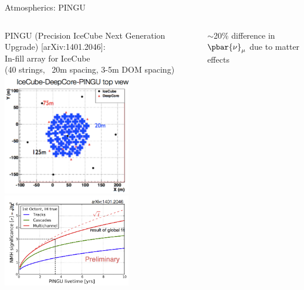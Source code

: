 \begin{frame}{Atmospherics: PINGU}
\begin{columns}
  \begin{column}{0.50\textwidth}
   \centering
   {\scriptsize
    PINGU (Precision IceCube Next Generation Upgrade) {\color{blue}[arXiv:1401.2046]}:\\
    In-fill array for IceCube\\
    (40 strings, ~20m spacing, 3-5m DOM spacing)\\
   }
   \includegraphics[width=0.65\textwidth]{./images/3nu/atmo/pingu_topview.png}\\
   \includegraphics[width=0.65\textwidth]{./images/3nu/atmo/pingu_sensitivity.png}\\
  \end{column}
  \begin{column}{0.50\textwidth}
   \centering
    {\scriptsize $\sim$20\% difference in $\pbar{\nu}_{\mu}$ due to matter effects}

\end{column}
\end{columns}
\end{frame}
